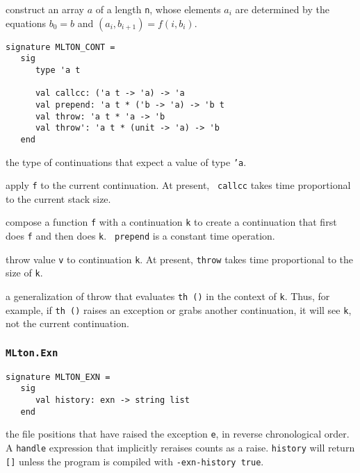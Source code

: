 \begin{description}

construct an array $a$ of a length {\tt n}, whose elements $a_i$ are determined
by the equations $b_0 = b$ and $(a_i, b_{i+1}) = f (i, b_i)$.

\end{description}


\begin{verbatim}
signature MLTON_CONT =
   sig
      type 'a t

      val callcc: ('a t -> 'a) -> 'a
      val prepend: 'a t * ('b -> 'a) -> 'b t
      val throw: 'a t * 'a -> 'b
      val throw': 'a t * (unit -> 'a) -> 'b
   end
\end{verbatim}

\begin{description}

the type of continuations that expect a value of type {\tt 'a}.

apply {\tt f} to the current continuation.  At present, {\tt
callcc} takes time proportional to the current stack size.

compose a function {\tt f} with a continuation {\tt k} to create a
continuation that first does {\tt f} and then does {\tt k}.  {\tt
prepend} is a constant time operation.

throw value {\tt v} to continuation {\tt k}.  At present, {\tt throw}
takes time proportional to the size of {\tt k}.

a generalization of throw that evaluates {\tt th ()} in the context
of {\tt k}.  Thus, for example, if {\tt th ()} raises an exception or
grabs another continuation, it will see {\tt k}, not the current
continuation.

\end{description}

\subsubsection{{\tt MLton.Exn}}
\begin{verbatim}
signature MLTON_EXN =
   sig
      val history: exn -> string list
   end
\end{verbatim}

\begin{description}

the file positions that have raised the exception {\tt e}, in reverse
chronological order.   A {\tt handle} expression that implicitly reraises counts
as a raise.  {\tt history} will return {\tt []} unless the program is compiled
with {\tt -exn-history true}.

\end{description}

